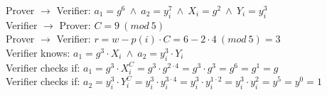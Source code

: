 \begin{infobox}
Prover \begin{math}\rightarrow\end{math} Verifier: \begin{math}a_1=g^6 \ \land\ a_2=y_i^7 \ \land \ X_i=g^2 \ \land \ Y_i=y_i^3 \end{math}\\
Verifier \begin{math}\rightarrow\end{math} Prover: \begin{math}C=9\ (mod \ 5) \end{math}\\
Prover \begin{math}\rightarrow\end{math} Verifier: \begin{math}r=w-p(i)  \cdot  C = 6-2  \cdot  4 \ (mod \ 5)= 3\end{math}\\
Verifier knows:  \begin{math}a_1=g^3  \cdot  X_i \ \land \ a_2=y_i^3  \cdot  Y_i \end{math}\\
Verifier checks if:  \begin{math}a_1 = g^3 \cdot X_i^C = g^3 \cdot g^{2 \cdot 4} = g^3  \cdot  g^3 = g^6= g^1= g\end{math}\\
Verifier checks if:  \begin{math} a_2=y_i^3  \cdot  Y_i^C = y_i^3  \cdot  y_i^{3 \cdot 4}= y_i^3  \cdot  y_i^{1 \cdot 2}= y_i^3  \cdot  y_i^2= y^5=y^0= 1 \end{math}
\end{infobox}


